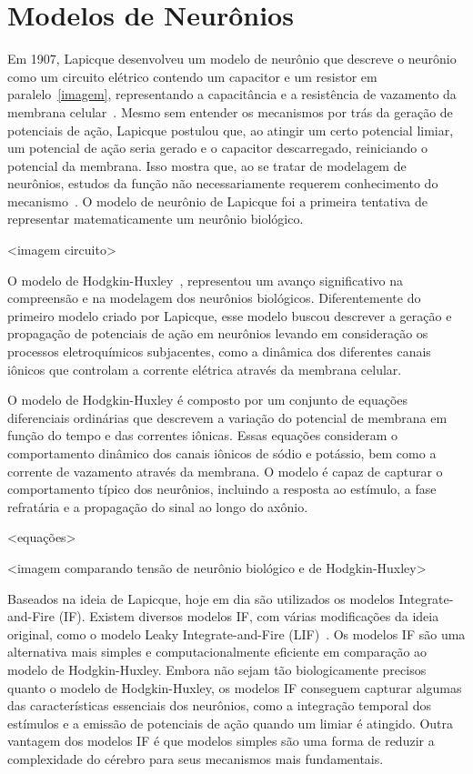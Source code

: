 \section{Modelos de Neurônios}\label{section_modelos_neuronios} 

Em 1907, Lapicque desenvolveu um modelo de neurônio que descreve o neurônio como um circuito elétrico contendo um capacitor e um
resistor em paralelo~\ref{imagem}, representando a capacitância e a resistência de vazamento da membrana
celular~\cite{lapicqueRecherches1907}. Mesmo sem entender os mecanismos por trás da geração de potenciais de ação, Lapicque
postulou que, ao atingir um certo potencial limiar, um potencial de ação seria gerado e o capacitor descarregado, reiniciando o
potencial da membrana. Isso mostra que, ao se tratar de modelagem de neurônios, estudos da função não necessariamente requerem
conhecimento do mecanismo~\cite{abbottLapicque1999}. O modelo de neurônio de Lapicque foi a primeira tentativa de representar
matematicamente um neurônio biológico.

<imagem circuito>

O modelo de Hodgkin-Huxley~\cite{hodgkinQuantitative1952}, representou um avanço significativo na compreensão e na modelagem dos
neurônios biológicos. Diferentemente do primeiro modelo criado por Lapicque, esse modelo buscou descrever a geração e propagação
de potenciais de ação em neurônios levando em consideração os processos eletroquímicos subjacentes, como a dinâmica dos diferentes
canais iônicos que controlam a corrente elétrica através da membrana celular.

O modelo de Hodgkin-Huxley é composto por um conjunto de equações diferenciais ordinárias que descrevem a variação do potencial de
membrana em função do tempo e das correntes iônicas. Essas equações consideram o comportamento dinâmico dos canais iônicos de
sódio e potássio, bem como a corrente de vazamento através da membrana. O modelo é capaz de capturar o comportamento típico dos
neurônios, incluindo a resposta ao estímulo, a fase refratária e a propagação do sinal ao longo do axônio.

<equações>

<imagem comparando tensão de neurônio biológico e de Hodgkin-Huxley>

Baseados na ideia de Lapicque, hoje em dia são utilizados os modelos Integrate-and-Fire (IF). Existem diversos modelos IF, com
várias modificações da ideia original, como o modelo Leaky Integrate-and-Fire (LIF)~\cite{burkitt2006review}. Os modelos IF são
uma alternativa mais simples e computacionalmente eficiente em comparação ao modelo de Hodgkin-Huxley. Embora não sejam tão
biologicamente precisos quanto o modelo de Hodgkin-Huxley, os modelos IF conseguem capturar algumas das características essenciais
dos neurônios, como a integração temporal dos estímulos e a emissão de potenciais de ação quando um limiar é atingido. Outra
vantagem dos modelos IF é que modelos simples são uma forma de reduzir a complexidade do cérebro para seus mecanismos mais
fundamentais.

